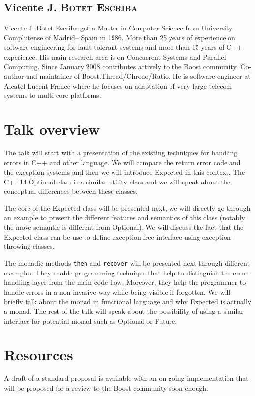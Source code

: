 \documentclass[a4paper,10pt]{article}
\begin{document}
\subsection{Vicente J. B\textsc{otet} E\textsc{scriba}}

Vicente J. Botet Escriba got a Master in Computer Science from University Complutense of Madrid– Spain in 1986. More than 25 years of experience on software engineering for fault tolerant systems and more than 15 years of C++ experience. His main research area is on Concurrent Systems and Parallel Computing. Since January 2008 contributes actively to the Boost community. Co-author and maintainer of Boost.Thread/Chrono/Ratio. He is software engineer at Alcatel-Lucent France where he focuses on adaptation of very large telecom systems to multi-core platforms.

\section{Talk overview}

The talk will start with a presentation of the existing techniques for handling errors in C++ and other language. We will compare the return error code and the exception systems and then we will introduce Expected in this context. The C++14 Optional class is a similar utility class and we will speak about the conceptual differences between these classes.
\newline

The core of the Expected class will be presented next, we will directly go through an example to present the different features and semantics of this class (notably the move semantic is different from Optional). We will discuss the fact that the Expected class can be use to define exception-free interface using exception-throwing classes.
\newline

The monadic methods \lstinline{then} and \lstinline{recover} will be presented next through different examples. They enable programming technique that help to distinguish the error-handling layer from the main code flow. Moreover, they help the programmer to handle errors in a non-invasive way while being visible if forgotten. We will briefly talk about the monad in functional language and why Expected is actually a monad. The rest of the talk will speak about the possibility of using a similar interface for potential monad such as Optional or Future.

\section{Resources}

A draft of a standard proposal is available\cite{std.expected} with an on-going implementation\cite{boost.expected} that will be proposed for a review to the Boost community soon enough.

\newpage


\end{document}

